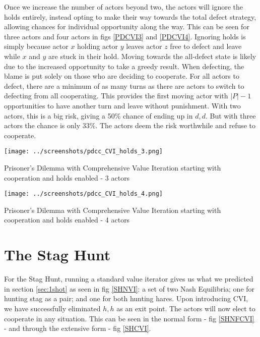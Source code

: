 Once we increase the number of actors beyond two, the actors will ignore the holds entirely, instead opting to make their way towards the total defect strategy, allowing chances for individual opportunity along the way. This can be seen for three actors and four actors in figs \ref{PDCVI3} and \ref{PDCVI4}. Ignoring holds is simply because actor $x$ holding actor $y$ leaves actor $z$ free to defect and leave while $x$ and $y$ are stuck in their hold. Moving towards the all-defect state is likely due to the increased opportunity to take a greedy result. When defecting, the blame is put solely on those who are deciding to cooperate. For all actors to defect, there are a minimum of as many turns as there are actors to switch to defecting from all cooperating. This provides the first moving actor with $|P|-1$ opportunities to have another turn and leave without punishment. With two actors, this is a big risk, giving a 50\% chance of ending up in $d,d$. But with three actors the chance is only 33\%. The actors deem the risk worthwhile and refuse to cooperate.

\begin{fig}[H]
  \begin{minipage}[b]{1.0\linewidth}
    \centering
    \centerline{\texttt{[image: ../screenshots/pdcc\_CVI\_holds\_3.png]}}
    \caption{Prisoner's Dilemma with Comprehensive Value Iteration starting with cooperation and holds enabled - 3 actors}\medskip\label{PDCVI3}
  \end{minipage}
\end{fig}

\begin{fig}[H]
  \begin{minipage}[b]{1.0\linewidth}
    \centering
    \centerline{\texttt{[image: ../screenshots/pdcc\_CVI\_holds\_4.png]}}
    \caption{Prisoner's Dilemma with Comprehensive Value Iteration starting with cooperation and holds enabled - 4 actors}\medskip\label{PDCVI4}
  \end{minipage}
\end{fig}

\section{The Stag Hunt}
For the Stag Hunt, running a standard value iterator gives us what we predicted in section \ref{sec:1shot} as seen in fig \ref{SHNVI}: a set of two Nash Equilibria; one for hunting stag as a pair; and one for both hunting hares. Upon introducing CVI, we have successfully eliminated $h,h$ as an exit point. The actors will now elect to cooperate in any situation. This can be seen in the normal form - fig \ref{SHNFCVI} - and through the extensive form - fig \ref{SHCVI}.

